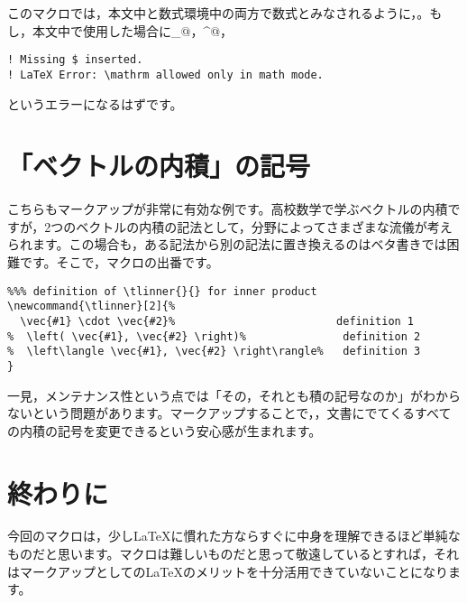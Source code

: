 \documentclass[autodetect-engine,dvipdfmx]{jsarticle}
\begin{document}
このマクロでは，本文中と数式環境中の両方で数式とみなされるように，\verb@{}。もし\verb@{}，本文中で使用した場合に\verb@_@，\verb@^@，\verb@{}

\begin{tcolorbox}

\begin{verbatim}
! Missing $ inserted.
! LaTeX Error: \mathrm allowed only in math mode.
\end{verbatim}

\end{tcolorbox}

というエラーになるはずです。

\part{「ベクトルの内積」の記号}

こちらもマークアップが非常に有効な例です。高校数学で学ぶベクトルの内積ですが，2つのベクトルの内積の記法として，分野によってさまざまな流儀が考えられます。この場合も，ある記法から別の記法に置き換えるのはベタ書きでは困難です。そこで，マクロの出番です。

\begin{tcolorbox}

\begin{verbatim}
%%% definition of \tlinner{}{} for inner product
\newcommand{\tlinner}[2]{%
  \vec{#1} \cdot \vec{#2}%                         definition 1
%  \left( \vec{#1}, \vec{#2} \right)%               definition 2
%  \left\langle \vec{#1}, \vec{#2} \right\rangle%   definition 3
}
\end{verbatim}

\end{tcolorbox}

一見\verb@{}，メンテナンス性という点では「その\verb@{}，それとも積の記号なのか」がわからないという問題があります。マークアップすることで，\verb@{}，文書にでてくるすべての内積の記号を変更できるという安心感が生まれます。

\part{終わりに}

今回のマクロは，少し\LaTeX に慣れた方ならすぐに中身を理解できるほど単純なものだと思います。マクロは難しいものだと思って敬遠しているとすれば，それはマークアップとしての\LaTeX のメリットを十分活用できていないことになります。
\end{document}

